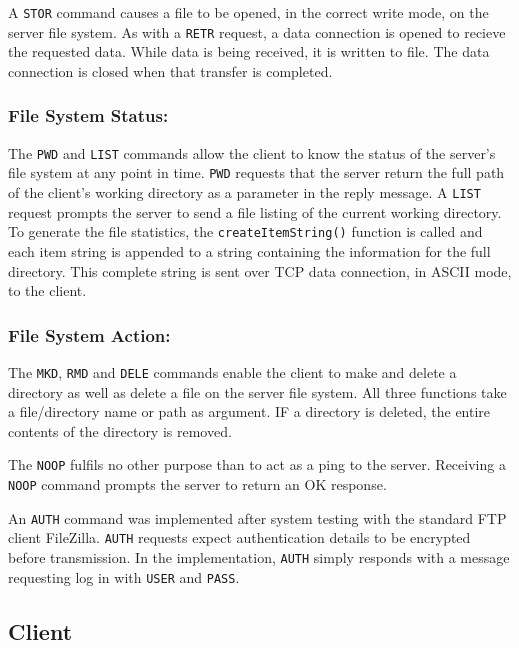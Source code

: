 \documentclass[10pt,twocolumn]{witseiepaper}
\begin{document}
A \texttt{STOR} command causes a file to be opened, in the correct write mode, on the server file system. As with a \texttt{RETR} request, a data connection is opened to recieve the requested data. While data is being received, it is written to file. The data connection is closed when that transfer is completed.

\vspace*{-2mm}
\subsubsection*{File System Status: }
The \texttt{PWD} and \texttt{LIST} commands allow the client to know the status of the server's file system at any point in time. \texttt{PWD} requests that the server return the full path of the client's working directory as a parameter in the reply message. A \texttt{LIST} request prompts the server to send a file listing of the current working directory. To generate the file statistics, the \texttt{createItemString()} function is called and each item string is appended to a string containing the information for the full directory. This complete string is sent over TCP data connection, in ASCII mode, to the client. 

\vspace*{-2mm}
\subsubsection*{File System Action: }
The \texttt{MKD}, \texttt{RMD} and \texttt{DELE} commands enable the client to make and delete a directory as well as delete a file on the server file system. All three functions take a file/directory name or path as argument. IF a directory is deleted, the entire contents of the directory is removed.

The \texttt{NOOP} fulfils no other purpose than to act as a ping to the server. Receiving a \texttt{NOOP} command prompts the server to return an OK response.

An \texttt{AUTH} command was implemented after system testing with the standard FTP client FileZilla. \texttt{AUTH} requests expect authentication details to be encrypted before transmission. In the implementation, \texttt{AUTH} simply responds with a message requesting log in with \texttt{USER} and \texttt{PASS}.


\subsection{Client}
\end{document}
